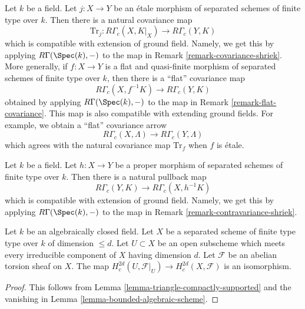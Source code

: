 \begin{remark}
\label{remark-covariance-compactly-supported}
Let $k$ be a field. Let $j : X \to Y$ be an \'etale morphism of separated
schemes of finite type over $k$. Then there
is a natural covariance map
$$
\text{Tr}_j : R\Gamma_c(X, K|_X) \to R\Gamma_c(Y, K)
$$
which is compatible with extension of ground field.
Namely, we get this by applying $R\Gamma(\Spec(k), -)$ to the map in
Remark \ref{remark-covariance-shriek}. More generally, if $f : X \to Y$
is a flat and quasi-finite morphism of separated schemes of finite type
over $k$, then there is a ``flat'' covariance map
$$
R\Gamma_c(X, f^{-1}K) \to R\Gamma_c(Y, K)
$$
obtained by applying $R\Gamma(\Spec(k), -)$ to the map in
Remark \ref{remark-flat-covariance}. This map is also compatible
with extending ground fields. For example, we obtain a
``flat'' covariance arrow
$$
R\Gamma_c(X, \Lambda) \longrightarrow R\Gamma_c(Y, \Lambda)
$$
which agrees with the natural covariance map $\text{Tr}_f$ when $f$ is \'etale.
\end{remark}

\begin{remark}
\label{remark-contravariance-compactly-supported}
Let $k$ be a field. Let $h : X \to Y$ be a proper morphism of separated
schemes of finite type over $k$. Then there is a natural pullback map
$$
R\Gamma_c(Y, K) \longrightarrow R\Gamma_c(X, h^{-1}K)
$$
which is compatible with extension of ground field.
Namely, we get this by applying $R\Gamma(\Spec(k), -)$ to the map in
Remark \ref{remark-contravariance-shriek}.
\end{remark}

\begin{lemma}
\label{lemma-top-algebraic-scheme}
Let $k$ be an algebraically closed field. Let $X$ be a separated
scheme of finite type type over $k$ of dimension $\leq d$. Let $U \subset X$
be an open subscheme which meets every irreducible component of $X$
having dimension $d$. Let $\mathcal{F}$ be an abelian torsion sheaf on $X$.
The map $H^{2d}_c(U, \mathcal{F}|_U) \to H^{2d}_c(X, \mathcal{F})$
is an isomorphism.
\end{lemma}

\begin{proof}
This follows from Lemma \ref{lemma-triangle-compactly-supported}
and the vanishing in Lemma \ref{lemma-bounded-algebraic-scheme}.
\end{proof}


